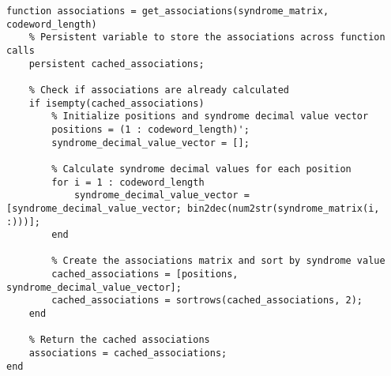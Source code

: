 \begin{lstlisting}
function associations = get_associations(syndrome_matrix, codeword_length)
    % Persistent variable to store the associations across function calls
    persistent cached_associations;
    
    % Check if associations are already calculated
    if isempty(cached_associations)
        % Initialize positions and syndrome decimal value vector
        positions = (1 : codeword_length)';
        syndrome_decimal_value_vector = [];
        
        % Calculate syndrome decimal values for each position
        for i = 1 : codeword_length
            syndrome_decimal_value_vector = [syndrome_decimal_value_vector; bin2dec(num2str(syndrome_matrix(i, :)))];
        end
        
        % Create the associations matrix and sort by syndrome value
        cached_associations = [positions, syndrome_decimal_value_vector];
        cached_associations = sortrows(cached_associations, 2);
    end
    
    % Return the cached associations
    associations = cached_associations;
end
\end{lstlisting}

